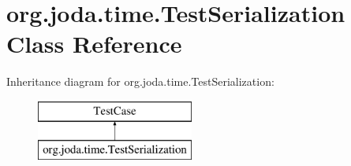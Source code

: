 \hypertarget{classorg_1_1joda_1_1time_1_1_test_serialization}{\section{org.\-joda.\-time.\-Test\-Serialization Class Reference}
\label{classorg_1_1joda_1_1time_1_1_test_serialization}
}
Inheritance diagram for org.\-joda.\-time.\-Test\-Serialization\-:\begin{figure}[H]
\begin{center}
\leavevmode
\includegraphics[height=2.000000cm]{classorg_1_1joda_1_1time_1_1_test_serialization}
\end{center}
\end{figure}
